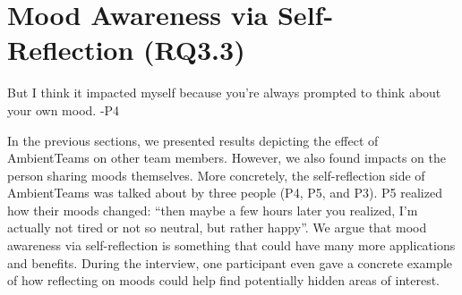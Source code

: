 






\section{Mood Awareness via Self-Reflection (RQ3.3)}

\begin{displayquote}
    But I think it impacted myself because you're always prompted to think about your own mood. -P4
\end{displayquote}

In the previous sections, we presented results depicting the effect of AmbientTeams on other team members. However, we also found impacts on the person sharing moods themselves. More concretely, the self-reflection side of AmbientTeams was talked about by three people (P4, P5, and P3). P5 realized how their moods changed: \enquote{then maybe a few hours later you realized, I'm actually not tired or not so neutral, but rather happy}. We argue that mood awareness via self-reflection is something that could have many more applications and benefits. During the interview, one participant even gave a concrete example of how reflecting on moods could help find potentially hidden areas of interest.

